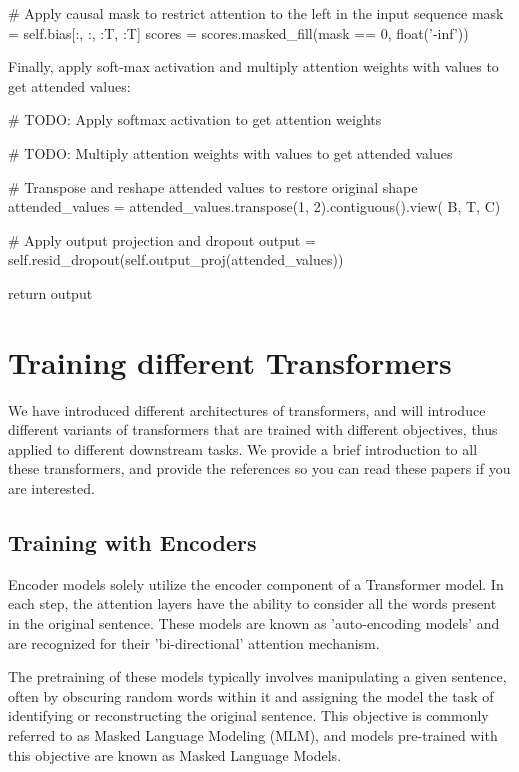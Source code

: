 \begin{exercise}
\begin{enumerate}
\begin{python}
        # Apply causal mask to restrict attention to the left in the input sequence
        mask = self.bias[:, :, :T, :T]
        scores = scores.masked_fill(mask == 0, float('-inf'))
\end{python}
Finally, apply soft-max activation and multiply attention weights with values to get attended values:
\begin{python}
        # TODO: Apply softmax activation to get attention weights

        # TODO: Multiply attention weights with values to get attended values

        # Transpose and reshape attended values to restore original shape
        attended_values = attended_values.transpose(1, 2).contiguous().view(
            B, T, C)

        # Apply output projection and dropout
        output = self.resid_dropout(self.output_proj(attended_values))

        return output
\end{python}
\end{enumerate}
\end{exercise}

\section{Training different Transformers}
We have introduced different architectures of transformers, and will introduce different variants of transformers that are trained with different objectives, thus applied to different downstream tasks. We provide a brief introduction to all these transformers, and provide the references so you can read these papers if you are interested.

\subsection{Training with Encoders}
Encoder models solely utilize the encoder component of a Transformer model. In each step, the attention layers have the ability to consider all the words present in the original sentence. These models are known as 'auto-encoding models' and are recognized for their 'bi-directional' attention mechanism.

The pretraining of these models typically involves manipulating a given sentence, often by obscuring random words within it and assigning the model the task of identifying or reconstructing the original sentence. This objective is commonly referred to as Masked Language Modeling (MLM), and models pre-trained with this objective are known as Masked Language Models.

